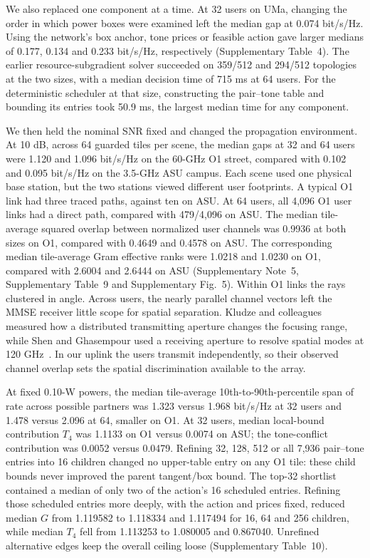 \documentclass[lineno,pdflatex,sn-nature]{sn-jnl}
\begin{document}
We also replaced one component at a time. At 32 users on UMa, changing the order in which power boxes were examined left the median gap at 0.074 bit/s/Hz. Using the network's box anchor, tone prices or feasible action gave larger medians of 0.177, 0.134 and 0.233 bit/s/Hz, respectively (Supplementary Table~4). The earlier resource-subgradient solver succeeded on 359/512 and 294/512 topologies at the two sizes, with a median decision time of 715 ms at 64 users. For the deterministic scheduler at that size, constructing the pair--tone table and bounding its entries took 50.9 ms, the largest median time for any component.

We then held the nominal SNR fixed and changed the propagation environment. At 10 dB, across 64 guarded tiles per scene, the median gaps at 32 and 64 users were 1.120 and 1.096 bit/s/Hz on the 60-GHz O1 street, compared with 0.102 and 0.095 bit/s/Hz on the 3.5-GHz ASU campus. Each scene used one physical base station, but the two stations viewed different user footprints. A typical O1 link had three traced paths, against ten on ASU. At 64 users, all 4,096 O1 user links had a direct path, compared with 479/4,096 on ASU. The median tile-average squared overlap between normalized user channels was 0.9936 at both sizes on O1, compared with 0.4649 and 0.4578 on ASU. The corresponding median tile-average Gram effective ranks were 1.0218 and 1.0230 on O1, compared with 2.6004 and 2.6444 on ASU (Supplementary Note~5, Supplementary Table~9 and Supplementary Fig.~5). Within O1 links the rays clustered in angle. Across users, the nearly parallel channel vectors left the MMSE receiver little scope for spatial separation. Kludze and colleagues measured how a distributed transmitting aperture changes the focusing range, while Shen and Ghasempour used a receiving aperture to resolve spatial modes at 120 GHz~\cite{kludze2026,shenoam2026}. In our uplink the users transmit independently, so their observed channel overlap sets the spatial discrimination available to the array.

At fixed 0.10-W powers, the median tile-average 10th-to-90th-percentile span of rate across possible partners was 1.323 versus 1.968 bit/s/Hz at 32 users and 1.478 versus 2.096 at 64, smaller on O1. At 32 users, median local-bound contribution \(T_4\) was 1.1133 on O1 versus 0.0074 on ASU; the tone-conflict contribution was 0.0052 versus 0.0479. Refining 32, 128, 512 or all 7,936 pair--tone entries into 16 children changed no upper-table entry on any O1 tile: these child bounds never improved the parent tangent/box bound. The top-32 shortlist contained a median of only two of the action's 16 scheduled entries. Refining those scheduled entries more deeply, with the action and prices fixed, reduced median \(G\) from 1.119582 to 1.118334 and 1.117494 for 16, 64 and 256 children, while median \(T_4\) fell from 1.113253 to 1.080005 and 0.867040. Unrefined alternative edges keep the overall ceiling loose (Supplementary Table~10).
\end{document}
